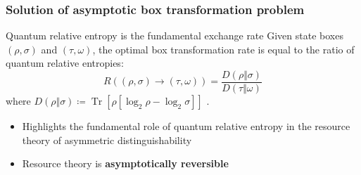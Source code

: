 \documentclass[usenames,dvipsnames,handout]{beamer}
\begin{document}
\begin{frame}
\frametitle{Solution of asymptotic box transformation problem}

\pause
\begin{block}{Quantum relative entropy is the fundamental exchange rate}
Given state boxes $(\rho,\sigma)$ and $(\tau,\omega)$, the optimal box transformation rate is equal to the ratio of quantum relative entropies:
$$
R((\rho,\sigma)\rightarrow(\tau,\omega)) = \frac{D(\rho\Vert\sigma)}{D(\tau\Vert\omega
)}
$$
where $D(\rho \Vert \sigma) \coloneqq  \operatorname{Tr}[\rho [\log_2 \rho - \log_2 \sigma]]$ \cite{U62}.

\end{block}

\begin{itemize}

\pause
\vspace{.1in}
\item Highlights the fundamental role of quantum relative entropy in the resource theory of asymmetric distinguishability

\pause
\vspace{.1in}
\item Resource theory is {\color{MidnightBlue}\textbf{asymptotically reversible}}

\end{itemize}


\end{frame}
\end{document}
